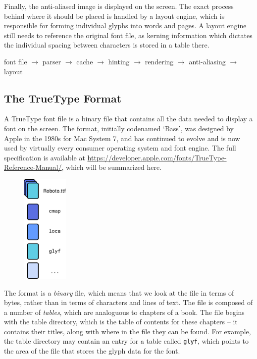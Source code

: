 \documentclass{report}
\begin{document}
Finally, the anti-aliased image is displayed on the screen. The exact process
behind where it should be placed is handled by a layout engine, which is
responsible for forming individual glyphs into words and pages. A layout engine
still needs to reference the original font file, as kerning information which
dictates the individual spacing between characters is stored in a table there.

font file $\rightarrow$ parser $\rightarrow$ cache $\rightarrow$ hinting $\rightarrow$
rendering $\rightarrow$ anti-aliasing $\rightarrow$ layout


\subsection{The TrueType Format}
A TrueType font file is a binary file that contains all the data needed to
display a font on the screen. The format, initially codenamed `Bass', was
designed by Apple in the 1980s for Mac System 7, and has continued to evolve and
is now used by virtually every consumer operating system and font engine. The
full specification is available at
\url{https://developer.apple.com/fonts/TrueType-Reference-Manual/}, which will
be summarized here.
\begin{figure}
  \centering
  \includegraphics[width=0.2\textwidth]{breakdownimg}
\end{figure}
The format is a \textit{binary} file, which means that we look at the file in
terms of bytes, rather than in terms of characters and lines of text. The file
is composed of a number of \textit{tables}, which are analoguous to chapters of
a book. The file begins with the table directory, which is the table of contents
for these chapters -- it contains their titles, along with where in the file
they can be found. For example, the table directory may contain an entry for a
table called \texttt{glyf}, which points to the area of the file that stores the
glyph data for the font. 
\end{document}
